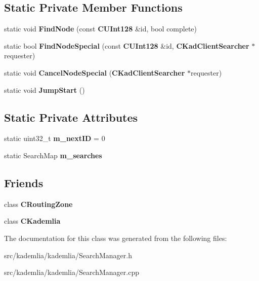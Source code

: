 \subsection*{Static Private Member Functions}
\begin{DoxyCompactItemize}
\item 
static void {\bfseries FindNode} (const {\bf CUInt128} \&id, bool complete)\label{classKademlia_1_1CSearchManager_a6eeaa7d31da037a8d439cdb392094f89}

\item 
static bool {\bfseries FindNodeSpecial} (const {\bf CUInt128} \&id, {\bf CKadClientSearcher} $\ast$requester)\label{classKademlia_1_1CSearchManager_a080a7648729c362ccdfad2f95c0f2b27}

\item 
static void {\bfseries CancelNodeSpecial} ({\bf CKadClientSearcher} $\ast$requester)\label{classKademlia_1_1CSearchManager_a711faa9265a1f8f866ccbe82f2fe8895}

\item 
static void {\bfseries JumpStart} ()\label{classKademlia_1_1CSearchManager_a39ebbe7bdf7ad7d5495162d22020465c}

\end{DoxyCompactItemize}
\subsection*{Static Private Attributes}
\begin{DoxyCompactItemize}
\item 
static uint32\_\-t {\bfseries m\_\-nextID} = 0\label{classKademlia_1_1CSearchManager_a6585bd75290ac07ccca7cf8b9c472b1c}

\item 
static SearchMap {\bfseries m\_\-searches}\label{classKademlia_1_1CSearchManager_ac00da3e11360ba987a9c08722e329ed9}

\end{DoxyCompactItemize}
\subsection*{Friends}
\begin{DoxyCompactItemize}
\item 
class {\bfseries CRoutingZone}\label{classKademlia_1_1CSearchManager_a565f90e6553418b810b84ff686ecd82f}

\item 
class {\bfseries CKademlia}\label{classKademlia_1_1CSearchManager_aae6fe0fc4b201e36eb06a5bcab7f0112}

\end{DoxyCompactItemize}


The documentation for this class was generated from the following files:\begin{DoxyCompactItemize}
\item 
src/kademlia/kademlia/SearchManager.h\item 
src/kademlia/kademlia/SearchManager.cpp\end{DoxyCompactItemize}
